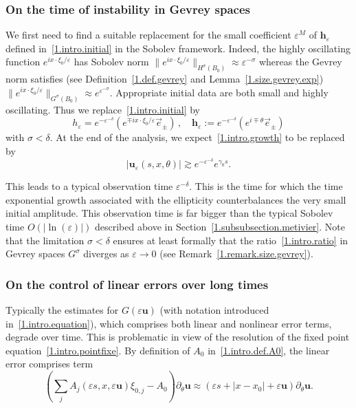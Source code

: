 \documentclass[10pt]{amsart}
\theoremstyle{definition}
\theoremstyle{plain}
\newcommand*\e{\varepsilon}
\newcommand{\dptl}{\partial}%
\newcommand*\g{\gamma}
\newcommand{\ubf}{{\mathbf u}}
\newcommand*\h{{\mathbf h}}
\begin{document}
\subsubsection{On the time of instability in Gevrey spaces}\label{1.subsubsection.time}

We first need to find a suitable replacement for the small coefficient $\e^{M}$ of $\h_{\e}$ defined in~\eqref{1.intro.initial} in the Sobolev framework. Indeed, the highly oscillating function $e^{ix\cdot\xi_0/\e}$ has Sobolev norm $ \|e^{ix\cdot\xi_0/\e}\|_{H^{\sigma}(B_0)} \approx \e^{-\sigma} $ whereas the Gevrey norm satisfies (see Definition~\ref{1.def.gevrey} and Lemma~\ref{1.size.gevrey.exp}) $ \|e^{ix\cdot\xi_0/\e}\|_{G^{\sigma}(B_0)} \approx e^{\e^{-\sigma}}$. Appropriate initial data are both small and highly oscillating. Thus we replace~\eqref{1.intro.initial} by
\begin{equation}\label{1.intro.initial.gevrey}
h_{\e} = e^{-\e^{-\delta}} \left(e^{\mp i x\cdot\xi_0/\e} \vec{e}_{\pm} \right)\,, \quad \h_{\e} := e^{-\e^{-\delta}}\left(e^{i\mp \theta}\vec{e}_{\pm}\right)
\end{equation}
with $\sigma < \delta$. At the end of the analysis, we expect~\eqref{1.intro.growth} to be replaced by
\begin{equation}\label{1.intro.growth.gevrey}
|\ubf_{\e}(s,x,\theta)| \gtrsim e^{-\e^{-\delta}} e^{\g_0 s}.
\end{equation}

This leads to a typical observation time $ \e^{-\delta} $. This is the time for which the time exponential growth associated with the ellipticity counterbalances the very small initial amplitude. This observation time is far bigger than the typical Sobolev time $O(|\ln(\e)|)$ described above in Section~\ref{1.subsubsection.metivier}. Note that the limitation $\sigma < \delta$ ensures at least formally that the ratio~\eqref{1.intro.ratio} in Gevrey spaces $G^{\sigma}$ diverges as $\e\to0$ (see Remark~\ref{1.remark.size.gevrey}).


\subsubsection{On the control of linear errors over long times}\label{1.subsubsection.control}

Typically the estimates for $G(\e \ubf)$ (with notation introduced in~\eqref{1.intro.equation}), which comprises both linear and nonlinear error terms, degrade over time. This is problematic in view of the resolution of the fixed point equation~\eqref{1.intro.pointfixe}. By definition of $A_0$ in~\eqref{1.intro.def.A0}, the linear error comprises term
\[
\left(\sum_j A_j(\e s,x,\e\ubf) \xi_{0,j} - A_0\right)\dptl_{\theta} \ubf \approx \left(\e s + |x-x_0| + \e \ubf\right)\dptl_{\theta}\ubf.
\]
\end{document}
